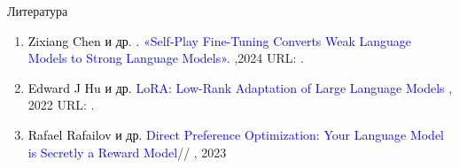 \documentclass{beamer}
\begin{document}
\begin{frame}{Литература}
\begin{enumerate}
    \item
      \textcolor{black}{Zixiang Chen и др. . }
      \textcolor{blue}{«Self-Play Fine-Tuning Converts Weak Language Models to Strong Language Models»}.
    ,2024
	  URL: .

  \item
    \textcolor{black}{Edward J Hu и др.}
    \textcolor{blue} {LoRA: Low-Rank Adaptation of Large Language Models}
    , 2022
	  URL: .

  \item
    \textcolor{black}{Rafael Rafailov и др.}
    \textcolor{blue}{Direct Preference Optimization: Your Language Model is Secretly a Reward Model}//
    , 2023
    
    \end{enumerate}
\end{frame}


\end{document}
